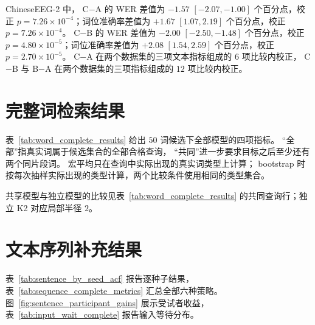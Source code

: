\noindent\begin{minipage}{\linewidth}
ChineseEEG-2 中，
C$-$A 的 WER 差值为 $-1.57$ $[-2.07,-1.00]$ 个百分点，校正 $p=7.26\times10^{-4}$；词位准确率差值为 $+1.67$ $[1.07,2.19]$ 个百分点，校正 $p=7.26\times10^{-4}$。
C$-$B 的 WER 差值为 $-2.00$ $[-2.50,-1.48]$ 个百分点，校正 $p=4.80\times10^{-5}$；词位准确率差值为 $+2.08$ $[1.54,2.59]$ 个百分点，校正 $p=2.70\times10^{-5}$。
C$-$A 在两个数据集的三项文本指标组成的 $6$ 项比较内校正，
C$-$B 与 B$-$A 在两个数据集的三项指标组成的 $12$ 项比较内校正。
\end{minipage}

\clearpage
\section{完整词检索结果}
\label{sec:supp_word_statistics}

表~\ref{tab:word_complete_results} 给出 $50$ 词候选下全部模型的四项指标。
“全部”指真实词属于候选集合的全部合格查询，
“共同”进一步要求目标之后至少还有两个同片段词。
宏平均只在查询中实际出现的真实词类型上计算；
bootstrap 时按每次抽样实际出现的类型计算，两个比较条件使用相同的类型集合。



共享模型与独立模型的比较见表~\ref{tab:word_complete_results} 的共同查询行；独立 K2 对应局部半径 $2$。


\begin{table}[!htbp]
    \centering
    \papertablestyle
    \caption{完整训练词库下局部与完整上下文的词检索结果（\%）。词库外目标计为未命中，差值为局部减完整上下文。}
    \label{tab:full_vocab_comparison}
    
\end{table}

\FloatBarrier
\clearpage
\section{文本序列补充结果}
\label{sec:supp_sentence}

表~\ref{tab:sentence_by_seed_acf} 报告逐种子结果，
表~\ref{tab:sequence_complete_metrics} 汇总全部六种策略。
图~\ref{fig:sentence_participant_gains} 展示受试者收益，
表~\ref{tab:input_wait_complete} 报告输入等待分布。



\begin{table}[!htbp]
    \centering
    \papertablestyle
    \caption{六种策略的文本质量（\%）与平均总输入等待（s）。B 与 C 的输出固定时刻相同，F-local 与 F 相同。}
    \label{tab:sequence_complete_metrics}
    
\end{table}

